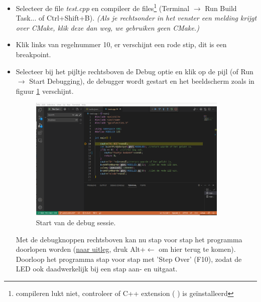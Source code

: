 \begin{enumerate}
\begin{itemize}
	\item Selecteer de file \textit{test.cpp} en compileer de files\footnote{compileren lukt niet, controleer of C++ extension ( ) is geïnstalleerd} (Terminal $\rightarrow$ Run Build Task... of Ctrl+Shift+B). \textit{(Als je rechtsonder in het venster een melding krijgt over CMake, klik deze dan weg, we gebruiken geen CMake.)}
	\item Klik links van regelnummer 10, er verschijnt een rode stip, dit is een breakpoint.
	\item Selecteer bij het pijltje rechtsboven  de Debug optie en klik op de pijl (of Run $\rightarrow$ Start Debugging), de debugger wordt gestart en het  beeldscherm zoals in figuur \ref{fig:debugScherm} verschijnt.
	\begin{figure}[h!]
		\centering
		\begin{center} 	
			\includegraphics[width=0.9\textwidth]{figuren/debugScherm}
			\caption{Start van de debug sessie.}
			\label{fig:debugScherm}   
		\end{center}
	\end{figure}
	
	Met de debugknoppen rechtsboven kan nu stap voor stap het programma doorlopen worden (\hyperlink{chp:debugknoppen}{naar uitleg}, druk Alt+\textbf{$\leftarrow$} om hier terug te komen).\\
	Doorloop het programma stap voor stap met 'Step Over' (F10), zodat de LED ook daadwerkelijk bij een stap aan- en uitgaat. 
\end{itemize}


\end{enumerate}
